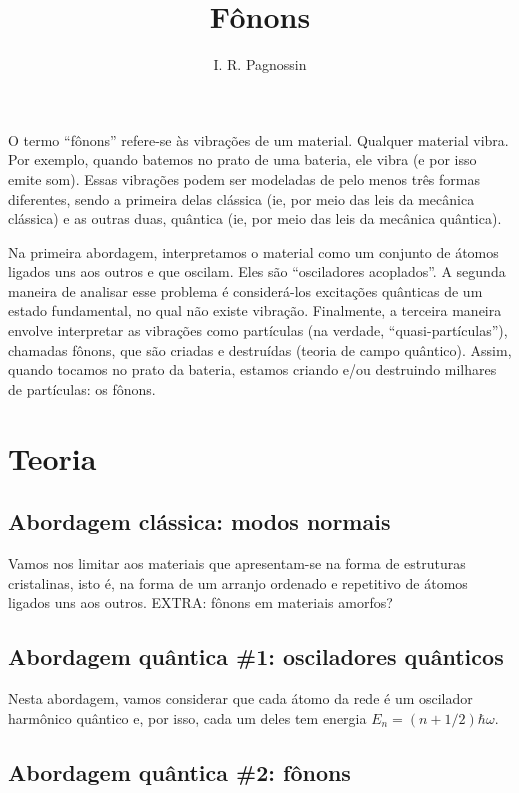 \documentclass[a4paper,12pt]{scrartcl}
\title{Fônons}
\author{I. R. Pagnossin}
\begin{document}
\maketitle

O termo ``fônons'' refere-se às vibrações de um material. Qualquer material vibra. Por exemplo, quando batemos no prato de uma bateria, ele vibra (e por isso emite som). Essas vibrações podem ser modeladas de pelo menos três formas diferentes, sendo a primeira delas clássica (ie, por meio das leis da mecânica clássica) e as outras duas, quântica (ie, por meio das leis da mecânica quântica).

Na primeira abordagem, interpretamos o material como um conjunto de átomos ligados uns aos outros e que oscilam. Eles são “osciladores acoplados”. A segunda maneira de analisar esse problema é considerá-los excitações quânticas de um estado fundamental, no qual não existe vibração. Finalmente, a terceira maneira envolve interpretar as vibrações como partículas (na verdade, “quasi-partículas”), chamadas fônons, que são criadas e destruídas (teoria de campo quântico). Assim, quando tocamos no prato da bateria, estamos criando e/ou destruindo milhares de partículas: os fônons.


\section{Teoria}

\subsection{Abordagem clássica: modos normais}

Vamos nos limitar aos materiais que apresentam-se na forma de estruturas cristalinas, isto é, na forma de um arranjo ordenado e repetitivo de átomos ligados uns aos outros.
EXTRA: fônons em materiais amorfos?

\subsection{Abordagem quântica \#1: osciladores quânticos}

Nesta abordagem, vamos considerar que cada átomo da rede é um oscilador harmônico quântico e, por isso, cada um deles tem energia $E_n = (n+1/2)\hbar \omega$.

\subsection{Abordagem quântica \#2: fônons}
\end{document}

